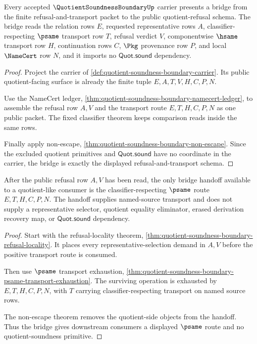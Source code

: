 \begin{theorem}
\label{thm:quotient-soundness-boundary-bridge-schema}
Every accepted $\QuotientSoundnessBoundaryUp$ carrier presents a bridge from the finite refusal-and-transport packet to the public quotient-refusal schema. The bridge reads the relation rows $E$, requested representative rows $A$, classifier-respecting $\psame$ transport row $T$, refusal verdict $V$, componentwise $\hsame$ transport row $H$, continuation rows $C$, $\Pkg$ provenance row $P$, and local $\NameCert$ row $N$, and it imports no $\mathsf{Quot.sound}$ dependency.
\end{theorem}
\begin{proof}
Project the carrier of \autoref{def:quotient-soundness-boundary-carrier}. Its public quotient-facing surface is already the finite tuple $E,A,T,V,H,C,P,N$.

Use the NameCert ledger, \autoref{thm:quotient-soundness-boundary-namecert-ledger}, to assemble the refusal row $A,V$ and the transport route $E,T,H,C,P,N$ as one public packet. The fixed classifier theorem keeps comparison reads inside the same rows.

Finally apply non-escape, \autoref{thm:quotient-soundness-boundary-non-escape}. Since the excluded quotient primitives and $\mathsf{Quot.sound}$ have no coordinate in the carrier, the bridge is exactly the displayed refusal-and-transport schema.
\end{proof}

\begin{theorem}
\label{thm:quotient-soundness-boundary-psame-bridge-handoff}
After the public refusal row $A,V$ has been read, the only bridge handoff available to a quotient-like consumer is the classifier-respecting $\psame$ route $E,T,H,C,P,N$. The handoff supplies named-source transport and does not supply a representative selector, quotient equality eliminator, erased derivation recovery map, or $\mathsf{Quot.sound}$ dependency.
\end{theorem}
\begin{proof}
Start with the refusal-locality theorem, \autoref{thm:quotient-soundness-boundary-refusal-locality}. It places every representative-selection demand in $A,V$ before the positive transport route is consumed.

Then use $\psame$ transport exhaustion, \autoref{thm:quotient-soundness-boundary-psame-transport-exhaustion}. The surviving operation is exhausted by $E,T,H,C,P,N$, with $T$ carrying classifier-respecting transport on named source rows.

The non-escape theorem removes the quotient-side objects from the handoff. Thus the bridge gives downstream consumers a displayed $\psame$ route and no quotient-soundness primitive.
\end{proof}

